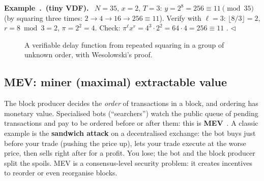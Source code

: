 \documentclass[11pt,a4paper]{article}
\newcounter{exn}[section]
\renewcommand{\theexn}{\thesection.\arabic{exn}}
\newenvironment{plainenglish}{\par\smallskip}{\par\smallskip}
\newenvironment{exbox}[1][]{\par\medskip\refstepcounter{exn}\noindent\textbf{Example~\theexn\if\relax\detokenize{#1}\relax\else\ (#1)\fi.}\ \ignorespaces}{\hfill$\triangleleft$\par\medskip}
\theoremstyle{definition}
\theoremstyle{plain}
\theoremstyle{remark}
\begin{document}
\begin{exbox}[tiny VDF]\label{ex:vdf}
$N=35$, $x=2$, $T=3$: $y=2^{8}=256\equiv11\pmod{35}$ (by squaring three times: $2\to4\to16\to256\equiv11$). Verify with $\ell=3$: $\lfloor8/3\rfloor=2$, $r=8\bmod3=2$, $\pi=2^2=4$. Check: $\pi^\ell x^r=4^3\cdot2^2=64\cdot4=256\equiv11$ \checkmark.
\end{exbox}

\begin{figure}[htbp]
\centering
{}
\caption{A verifiable delay function from repeated squaring in a group of unknown order, with Wesolowski's proof.}
\end{figure}

\subsection{MEV: miner (maximal) extractable value}

\begin{plainenglish}
The block producer decides the \emph{order} of transactions in a block, and ordering has monetary value. Specialised bots (``searchers'') watch the public queue of pending transactions and pay to be ordered before or after them: this is \textbf{MEV}~\cite{DGKLZBBJ20}. A classic example is the \textbf{sandwich attack} on a decentralised exchange:
the bot buys just before your trade (pushing the price up), lets your trade execute at the worse price, then sells right after for a profit. You lose; the bot and the block producer split the spoils. MEV is a consensus-level security problem: it creates incentives to reorder or even reorganise blocks.
\end{plainenglish}
\end{document}
